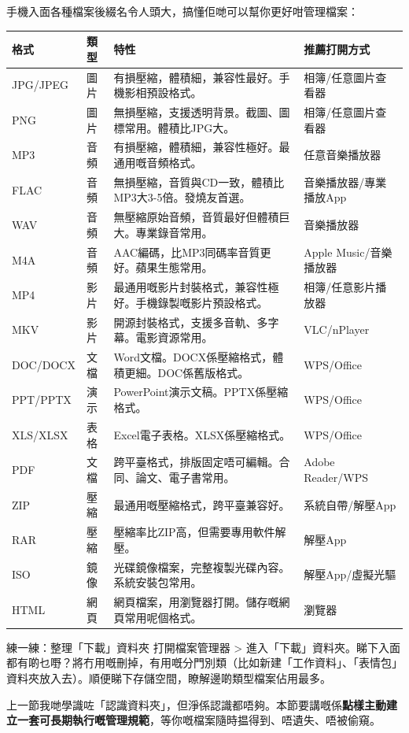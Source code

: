 
手機入面各種檔案後綴名令人頭大，搞懂佢哋可以幫你更好咁管理檔案：

\begin{center}
\begin{tabularx}{\linewidth}{|X|X|X|X|}
\hline
\textbf{格式} & \textbf{類型} & \textbf{特性} & \textbf{推薦打開方式} \tabularnewline
\hline
JPG/JPEG & 圖片 & 有損壓縮，體積細，兼容性最好。手機影相預設格式。 & 相簿/任意圖片查看器 \tabularnewline
PNG & 圖片 & 無損壓縮，支援透明背景。截圖、圖標常用。體積比JPG大。 & 相簿/任意圖片查看器 \tabularnewline
MP3 & 音頻 & 有損壓縮，體積細，兼容性極好。最通用嘅音頻格式。 & 任意音樂播放器 \tabularnewline
FLAC & 音頻 & 無損壓縮，音質與CD一致，體積比MP3大3-5倍。發燒友首選。 & 音樂播放器/專業播放App \tabularnewline
WAV & 音頻 & 無壓縮原始音頻，音質最好但體積巨大。專業錄音常用。 & 音樂播放器 \tabularnewline
M4A & 音頻 & AAC編碼，比MP3同碼率音質更好。蘋果生態常用。 & Apple Music/音樂播放器 \tabularnewline
MP4 & 影片 & 最通用嘅影片封裝格式，兼容性極好。手機錄製嘅影片預設格式。 & 相簿/任意影片播放器 \tabularnewline
MKV & 影片 & 開源封裝格式，支援多音軌、多字幕。電影資源常用。 & VLC/nPlayer \tabularnewline
DOC/DOCX & 文檔 & Word文檔。DOCX係壓縮格式，體積更細。DOC係舊版格式。 & WPS/Office \tabularnewline
PPT/PPTX & 演示 & PowerPoint演示文稿。PPTX係壓縮格式。 & WPS/Office \tabularnewline
XLS/XLSX & 表格 & Excel電子表格。XLSX係壓縮格式。 & WPS/Office \tabularnewline
PDF & 文檔 & 跨平臺格式，排版固定唔可編輯。合同、論文、電子書常用。 & Adobe Reader/WPS \tabularnewline
ZIP & 壓縮 & 最通用嘅壓縮格式，跨平臺兼容好。 & 系統自帶/解壓App \tabularnewline
RAR & 壓縮 & 壓縮率比ZIP高，但需要專用軟件解壓。 & 解壓App \tabularnewline
ISO & 鏡像 & 光碟鏡像檔案，完整複製光碟內容。系統安裝包常用。 & 解壓App/虛擬光驅 \tabularnewline
HTML & 網頁 & 網頁檔案，用瀏覽器打開。儲存嘅網頁常用呢個格式。 & 瀏覽器 \tabularnewline
\hline
\end{tabularx}
\end{center}

\begin{tcbpractice}{練一練：整理「下載」資料夾}
打開檔案管理器 > 進入「下載」資料夾。睇下入面都有啲乜嘢？將冇用嘅刪掉，有用嘅分門別類（比如新建「工作資料」、「表情包」資料夾放入去）。順便睇下存儲空間，瞭解邊啲類型檔案佔用最多。

\end{tcbpractice}


上一節我哋學識咗「認識資料夾」，但淨係認識都唔夠。本節要講嘅係\textbf{點樣主動建立一套可長期執行嘅管理規範}，等你嘅檔案隨時揾得到、唔遺失、唔被偷窺。

